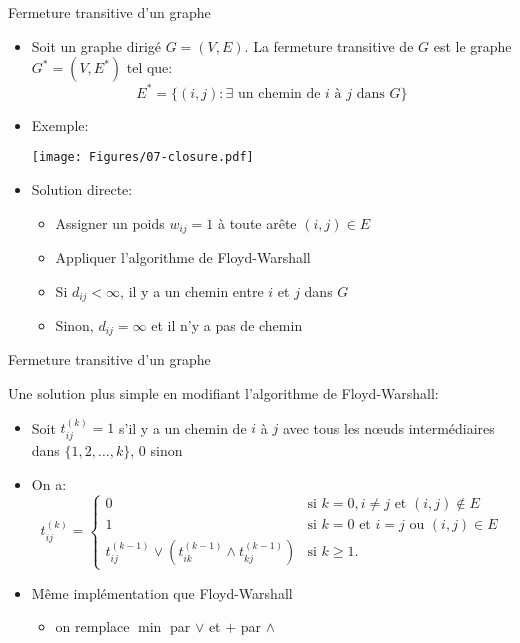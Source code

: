 \begin{frame}{Fermeture transitive d'un graphe}
\begin{itemize}
\item Soit un graphe dirigé $G=(V,E)$. La \alert{fermeture transitive} de $G$ est le graphe $G^*=(V,E^*)$ tel que:
$$E^*=\{(i,j): \exists\mbox{ un chemin de }i\mbox{ à }j\mbox{ dans }G\}$$

\item Exemple:

\bigskip

\centerline{\texttt{[image: Figures/07-closure.pdf]}}

\bigskip

\item Solution directe:
\begin{itemize}
\item Assigner un poids $w_{ij}=1$ à toute arête $(i,j)\in E$
\item Appliquer l'algorithme de Floyd-Warshall
\item Si $d_{ij}<\infty$, il y a un chemin entre $i$ et $j$ dans $G$
\item Sinon, $d_{ij}=\infty$ et il n'y a pas de chemin
\end{itemize}
\end{itemize}

\end{frame}

\begin{frame}{Fermeture transitive d'un graphe}

Une solution plus simple en modifiant l'algorithme de Floyd-Warshall:
\begin{itemize}
\item Soit $t_{ij}^{(k)}=1$ s'il y a un chemin de $i$ à $j$ avec tous les n\oe uds intermédiaires dans $\{1,2,\ldots,k\}$, 0 sinon
\item On a:
{\small
\[t_{ij}^{(k)}=\left\{ \begin{array}{ll}
0&\mbox{si }k=0, i\neq j\mbox{ et }(i,j)\notin E\\
1& \mbox{si }k=0\mbox{ et }i=j\mbox{ ou }(i,j)\in E\\
t_{ij}^{(k-1)}\vee (t_{ik}^{(k-1)}\wedge t_{kj}^{(k-1)}) & \mbox{si } k\geq 1.
\end{array}\right.\]
}
\item Même implémentation que Floyd-Warshall
\begin{itemize}
\item on remplace $\min$ par $\vee$ et $+$ par $\wedge$
\end{itemize}
\end{itemize}

\end{frame}

